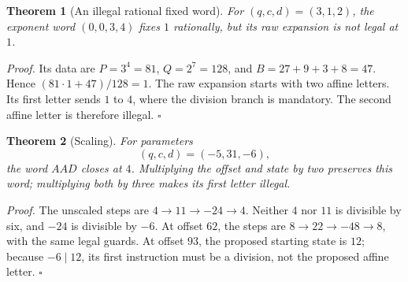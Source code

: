 \documentclass[11pt,letterpaper]{article}
\newtheorem{theorem}{Theorem}
\newenvironment{proof}{\noindent\textit{Proof.}}{\hfill\(\square\)}
\begin{document}
\begin{theorem}[An illegal rational fixed word]
For \((q,c,d)=(3,1,2)\), the exponent word \((0,0,3,4)\) fixes \(1\)
rationally, but its raw expansion is not legal at \(1\).
\end{theorem}
\begin{proof}
Its data are \(P=3^4=81\), \(Q=2^7=128\), and
\(B=27+9+3+8=47\). Hence \((81\cdot1+47)/128=1\).
The raw expansion starts with two affine letters. Its first letter sends
\(1\) to \(4\), where the division branch is mandatory. The second affine
letter is therefore illegal.
\end{proof}

\begin{theorem}[Scaling]
For parameters
\[
(q,c,d)=(-5,31,-6),
\]
the word \(AAD\) closes at \(4\).
Multiplying the offset and state by two preserves this word;
multiplying both by three makes its first letter illegal.
\end{theorem}
\begin{proof}
The unscaled steps are \(4\to11\to-24\to4\).
Neither \(4\) nor \(11\) is divisible by six, and \(-24\) is divisible by \(-6\).
At offset \(62\), the steps are \(8\to22\to-48\to8\), with the same legal guards.
At offset \(93\), the proposed starting state is \(12\); because \(-6\mid12\),
its first instruction must be a division, not the proposed affine letter.
\end{proof}



\end{document}

